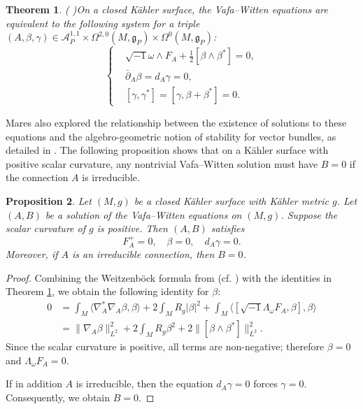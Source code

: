 \documentclass[12pt, twoside]{article}
\newtheorem{theorem}{Theorem}[section]
\newtheorem{proposition}[theorem]{Proposition}
\theoremstyle{definition}
\numberwithin{equation}{section}
\def \b {\beta}
\def \La {\Lambda}
\def\w {\omega}
\def\Om{\Omega}
\def\pa{\partial}
\def\na {\nabla}
\begin{document}
\begin{theorem}(\cite[Theorem 7.1.2]{Mar10} )\label{T4}
	On a closed K\"{a}hler surface, the Vafa--Witten equations are equivalent to the following system 
	for a triple $(A,\b,\gamma)\in\mathcal{A}_{P}^{1,1}\times\Om^{2,0}(M,\mathfrak{g}_{P})\times\Om^{0}(M,\mathfrak{g}_{P})$:
	\begin{equation}
	\left\{
	\begin{split}
	&\sqrt{-1}\w\wedge F_{A}+\frac{1}{2}[\b\wedge\b^{\ast}]=0,\\
	&\bar{\pa}_{A}\b=d_{A}\gamma=0,\\
	&[\gamma,\gamma^{\ast}]=[\gamma,\b+\b^{\ast}]=0.
	\end{split}
	\right.
	\end{equation}
\end{theorem}

Mares also explored the relationship between the existence of solutions to these equations and the algebro-geometric notion of stability for vector bundles, as detailed in \cite{Mar10,Tan15}. The following proposition shows that on a Kähler surface with positive scalar curvature, any nontrivial Vafa--Witten solution must have $B=0$ if the connection $A$ is irreducible.

\begin{proposition}\label{P5}
	Let $(M,g)$ be a closed K\"{a}hler surface with K\"{a}hler metric $g$. Let $(A,B)$ be a solution of the Vafa--Witten equations on $(M,g)$.
	 Suppose the scalar curvature of $g$ is positive. Then $(A,B)$ satisfies 
	$$F_{A}^{+}=0,\quad \b=0,\quad d_{A}\gamma=0.$$
	Moreover, if $A$ is an irreducible connection, then $B=0$. 
\end{proposition}

\begin{proof}
	Combining the Weitzenböck formula from \cite[Proposition 2.2]{Hua24} (cf. \cite[Proposition 2.3]{Ito87}) with the identities in Theorem \ref{T4},  we obtain the following identity for $\b$:
	\begin{equation*}
	\begin{split}
	0&=\int_{M}\langle\na_{A}^{\ast}\na_{A}\b,\b\rangle+2\int_{M}R_{g}|\b|^{2}+\int_{M}\langle[\sqrt{-1}\La_{\w}F_{A},\b],\b\rangle\\
	&=\|\na_{A}\b\|_{L^2}^{2}+2\int_{M}R_{g}\b^{2}+2\|[\b\wedge\b^{\ast}]\|^{2}_{L^2}.
	\end{split}
	\end{equation*}
	Since the scalar curvature is positive, all terms are non-negative; therefore $\b=0$ and $\La_{\w}F_{A}=0$. 
	
	If in addition $A$ is irreducible, then the equation  $d_{A}\gamma=0$ forces $\gamma=0$. Consequently, we obtain $B=0$. 
\end{proof}
\end{document}
